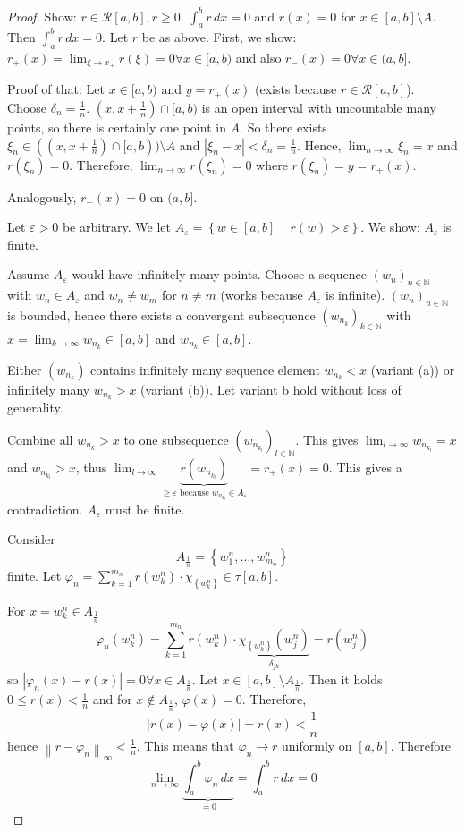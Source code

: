 \documentclass{article}
\newcommand{\set}[1]{\left\{#1\right\}}
\newcommand{\setdef}[2]{\left\{\left.#1\,\middle|\,#2\right.\right\}}
\newcommand{\norm}[1]{\left\|#1\right\|}
\newcommand{\card}[1]{\left|#1\right|}
\begin{document}
\begin{proof}
  Show: $r \in \mathcal R[a,b], r \geq 0$. $\int_a^b r \, dx = 0$
  and $r(x) = 0$ for $x \in [a,b] \setminus A$. Then $\int_a^b r \, dx = 0$.
  Let $r$ be as above. First, we show: $r_+(x) = \lim_{\xi\to x_+} r(\xi) = 0 \forall x \in [a,b)$
  and also $r_-(x) = 0 \forall x \in (a,b]$.

  Proof of that: Let $x \in [a,b)$ and $y = r_+(x)$ (exists because $r \in \mathcal R[a,b]$).
  Choose $\delta_n = \frac1n$. $(x, x + \frac1n) \cap [a,b)$ is an open interval with uncountable many points,
  so there is certainly one point in $A$. So there exists $\xi_n \in ((x, x + \frac1n) \cap [a,b)) \setminus A$
  and $\card{\xi_n - x} < \delta_n = \frac1n$.
  Hence, $\lim_{n\to\infty} \xi_n = x$ and $r(\xi_n) = 0$. Therefore, $\lim_{n\to\infty} r(\xi_n) = 0$ where $r(\xi_n) = y = r_+(x)$.

  Analogously, $r_-(x) = 0$ on $(a,b]$.

  Let $\varepsilon > 0$ be arbitrary. We let $A_{\varepsilon} = \setdef{w \in [a,b]}{r(w) > \varepsilon}$.
  We show: $A_{\varepsilon}$ is finite.

  Assume $A_{\varepsilon}$ would have infinitely many points. Choose a sequence $(w_n)_{n \in \mathbb N}$ with $w_n \in A_{\varepsilon}$ and $w_n \neq w_m$ for $n \neq m$ (works because $A_{\varepsilon}$ is infinite). $(w_n)_{n \in \mathbb N}$ is bounded, hence there exists a convergent subsequence $(w_{n_k})_{k \in \mathbb N}$ with $x = \lim_{k\to\infty} w_{n_k} \in [a,b]$ and $w_{n_k} \in [a,b]$.

  Either $(w_{n_k})$ contains infinitely many sequence element $w_{n_k} < x$ (variant (a)) or infinitely many $w_{n_k} > x$ (variant (b)). Let variant b hold without loss of generality.

  Combine all $w_{n_k} > x$ to one subsequence $(w_{n_{k_l}})_{l \in \mathbb N}$. This gives $\lim_{l\to\infty} w_{n_{k_l}} = x$ and $w_{n_{k_l}} > x$, thus $\lim_{l\to\infty} \underbrace{r(w_{n_{k_l}})}_{\geq \varepsilon \text{ because } w_{n_{k_l}} \in A_{\varepsilon}} = r_+(x) = 0$. This gives a contradiction. $A_{\varepsilon}$ must be finite.

  Consider
  \[ A_{\frac1n} = \set{w_1^n, \dots, w_{m_n}^n} \]
  finite. Let $\varphi_n = \sum_{k=1}^{m_n} r(w_k^n) \cdot \chi_{\set{w_k^n}} \in \tau[a,b]$.

  For $x = w^n_k \in A_{\frac1n}$
  \[ \varphi_n(w_k^n) = \sum_{k=1}^{m_n} r(w_k^n) \cdot \underbrace{\chi_{\set{w_k^n}} (w_j^n)}_{\delta_{jk}} = r(w_j^n) \]
  so $\card{\varphi_n(x) - r(x)} = 0 \forall x \in A_{\frac1n}$.
  Let $x \in [a,b] \setminus A_{\frac1n}$. Then it holds $0 \leq r(x) < \frac1n$ and for $x \not\in A_{\frac1n}$, $\varphi(x) = 0$.
  Therefore,
  \[ \card{r(x) - \varphi(x)} = r(x) < \frac1n \]
  hence $\norm{r - \varphi_n}_{\infty} < \frac1n$. This means that $\varphi_n \to r$ uniformly on $[a,b]$.
  Therefore
  \[ \lim_{n\to\infty} \underbrace{\int_a^b \varphi_n \, dx}_{= 0} = \int_a^b r \, dx = 0 \]


\end{proof}
\end{document}

